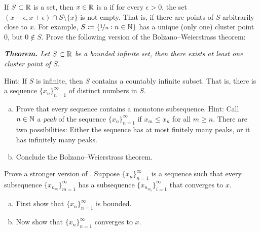 \begin{exercise}
If $S \subset {\mathbb{R}}$ is a set, then $x \in {\mathbb{R}}$ is a \emph{}
if for every $\epsilon > 0$, the set $(x-\epsilon,x+\epsilon) \cap S
\setminus \{ x \}$ is not empty.  That is, if there are points of $S$
arbitrarily close to $x$.
For example, $S \coloneqq \{ \nicefrac{1}{n} : n \in {\mathbb{N}} \}$ has a unique (only
one) cluster point $0$, but $0 \notin S$.
Prove the following version of the Bolzano--Weierstrass theorem:

\medskip

\noindent
\emph{\textbf{Theorem.} Let $S \subset {\mathbb{R}}$ be a bounded infinite set,
then there exists at least one cluster point of $S$}.

\medskip

Hint: If $S$ is infinite, then $S$ contains a countably infinite subset.
That is, there is a sequence $\{ x_n \}_{n=1}^\infty$ of distinct numbers in $S$.
\end{exercise}

\begin{samepage}
\begin{exercise}[Challenging]
\leavevmode
\begin{enumerate}[a)]
\item
Prove that every sequence contains a monotone subsequence.
Hint: Call $n \in {\mathbb{N}}$ a \emph{peak}
of the sequence
$\{ x_n \}_{n=1}^\infty$
if $x_m \leq x_n$ for all $m \geq n$.
There are two possibilities: Either the sequence has at most finitely many
peaks,
or it has infinitely many peaks.
\item
Conclude the Bolzano--Weierstrass theorem.
\end{enumerate}
\end{exercise}
\end{samepage}

\begin{exercise}
\pagebreak[2]
Prove a stronger version of .
Suppose $\{ x_n \}_{n=1}^\infty$ is a sequence such that every subsequence
$\{ x_{n_m} \}_{m=1}^\infty$ has a subsequence
$\{ x_{n_{m_i}} \}_{i=1}^\infty$ that converges to $x$.
\begin{enumerate}[a)]
\item
First show that $\{ x_n \}_{n=1}^\infty$ is
bounded.
\item
Now show that $\{ x_n \}_{n=1}^\infty$ converges to $x$.
\end{enumerate}
\end{exercise}


